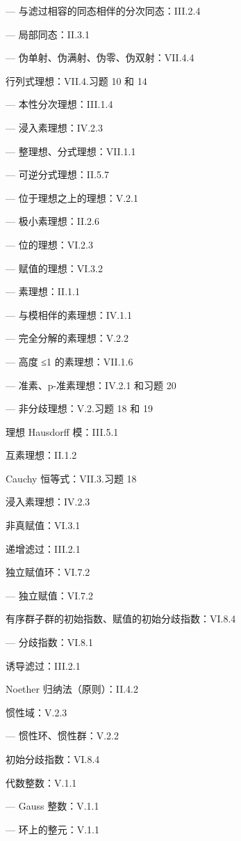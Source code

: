 --- 与滤过相容的同态相伴的分次同态：III.2.4

--- 局部同态：II.3.1

--- 伪单射、伪满射、伪零、伪双射：VII.4.4

行列式理想：VII.4.习题 10 和 14

--- 本性分次理想：III.1.4

--- 浸入素理想：IV.2.3

--- 整理想、分式理想：VII.1.1

--- 可逆分式理想：II.5.7

--- 位于理想之上的理想：V.2.1

--- 极小素理想：II.2.6

--- 位的理想：VI.2.3

--- 赋值的理想：VI.3.2

--- 素理想：II.1.1

--- 与模相伴的素理想：IV.1.1

--- 完全分解的素理想：V.2.2

--- 高度 ≤1 的素理想：VII.1.6

--- 准素、p-准素理想：IV.2.1 和习题 20

--- 非分歧理想：V.2.习题 18 和 19

理想 Hausdorff 模：III.5.1

互素理想：II.1.2

Cauchy 恒等式：VII.3.习题 18

浸入素理想：IV.2.3

非真赋值：VI.3.1

递增滤过：III.2.1

独立赋值环：VI.7.2

--- 独立赋值：VI.7.2

有序群子群的初始指数、赋值的初始分歧指数：VI.8.4

--- 分歧指数：VI.8.1

诱导滤过：III.2.1

Noether 归纳法（原则）：II.4.2

惯性域：V.2.3

--- 惯性环、惯性群：V.2.2

初始分歧指数：VI.8.4

代数整数：V.1.1

--- Gauss 整数：V.1.1

--- 环上的整元：V.1.1

